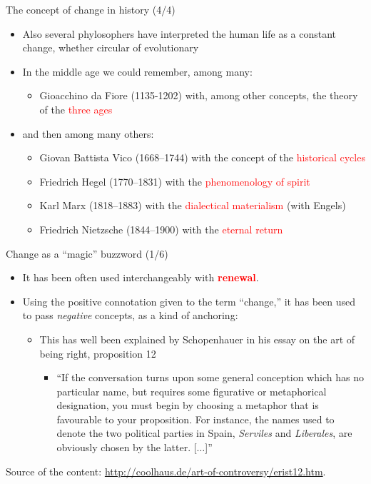 \documentclass{beamer}
\begin{document}
\begin{frame}
{\centerline{The concept of change in history (4/4)}}
 
\begin{itemize}
 \item Also several phylosophers have interpreted the human life as a constant change, whether circular of evolutionary
 \item In the middle age we could remember, among many:
 \begin{itemize}
 \item Gioacchino da Fiore (1135-1202) with, among other concepts, the theory of the \textcolor{red}{three ages}
\end{itemize} 
 \item and then among many others:
\begin{itemize}
\item Giovan Battista Vico (1668--1744) with the concept of the  \textcolor{red}{historical cycles}
\item  Friedrich Hegel (1770--1831) with the \textcolor{red}{phenomenology of spirit}
\item Karl  Marx (1818--1883) with the \textcolor{red}{dialectical materialism} (with Engels)
\item Friedrich Nietzsche (1844--1900) with the \textcolor{red}{eternal return}
\end{itemize} 
\end{itemize} 

\end{frame}

\begin{frame}
{\centerline{Change as a ``magic'' buzzword (1/6)}}
 
\begin{itemize}
 \item It has been often used interchangeably with  \textbf{\textcolor{red}{renewal}}.
 \item Using the positive connotation given to the term ``change,'' it has been used to pass \textit{negative} concepts, as a kind of anchoring:
 \begin{itemize}
\item This has well been explained by Schopenhauer in his essay on the art of being right, proposition 12
 \begin{itemize}
\item ``If the conversation turns upon some general conception which has no particular name, but requires some figurative or metaphorical designation, you must begin by choosing a metaphor that is favourable to your proposition. For instance, the names used to denote the two political parties in Spain, \textit{Serviles} and \textit{Liberales}, are obviously chosen by the latter. [$\ldots{}$]''
 \end{itemize} 
 \end{itemize} 
  \end{itemize} 
\begin{center}
\tiny
Source of the content: \url{http://coolhaus.de/art-of-controversy/erist12.htm}.
\end{center}

\end{frame}
\end{document}
